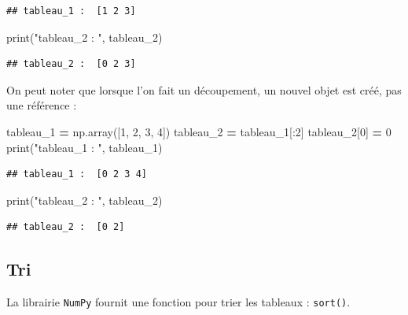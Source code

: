 \documentclass[
  12pt,
]{book}
\newenvironment{Shaded}{\begin{snugshade}}{\end{snugshade}}
\newcommand{\BuiltInTok}[1]{#1}
\newcommand{\DecValTok}[1]{\textcolor[rgb]{0.00,0.00,0.81}{#1}}
\newcommand{\NormalTok}[1]{#1}
\newcommand{\OperatorTok}[1]{\textcolor[rgb]{0.81,0.36,0.00}{\textbf{#1}}}
\newcommand{\StringTok}[1]{\textcolor[rgb]{0.31,0.60,0.02}{#1}}
\numberwithin{equation}{section}
\numberwithin{countremarque}{section}
\begin{document}
\begin{lstlisting}
## tableau_1 :  [1 2 3]
\end{lstlisting}

\begin{Shaded}
\begin{Highlighting}[]
\BuiltInTok{print}\NormalTok{(}\StringTok{"tableau\_2 : "}\NormalTok{, tableau\_2)}
\end{Highlighting}
\end{Shaded}

\begin{lstlisting}
## tableau_2 :  [0 2 3]
\end{lstlisting}

On peut noter que lorsque l'on fait un découpement, un nouvel objet est créé, pas une référence :

\begin{Shaded}
\begin{Highlighting}[]
\NormalTok{tableau\_1 }\OperatorTok{=}\NormalTok{ np.array([}\DecValTok{1}\NormalTok{, }\DecValTok{2}\NormalTok{, }\DecValTok{3}\NormalTok{, }\DecValTok{4}\NormalTok{])}
\NormalTok{tableau\_2 }\OperatorTok{=}\NormalTok{ tableau\_1[:}\DecValTok{2}\NormalTok{]}
\NormalTok{tableau\_2[}\DecValTok{0}\NormalTok{] }\OperatorTok{=} \DecValTok{0}
\BuiltInTok{print}\NormalTok{(}\StringTok{"tableau\_1 : "}\NormalTok{, tableau\_1)}
\end{Highlighting}
\end{Shaded}

\begin{lstlisting}
## tableau_1 :  [0 2 3 4]
\end{lstlisting}

\begin{Shaded}
\begin{Highlighting}[]
\BuiltInTok{print}\NormalTok{(}\StringTok{"tableau\_2 : "}\NormalTok{, tableau\_2)}
\end{Highlighting}
\end{Shaded}

\begin{lstlisting}
## tableau_2 :  [0 2]
\end{lstlisting}

\subsection{Tri}\label{tri-1}

La librairie \texttt{NumPy} fournit une fonction pour trier les tableaux : \texttt{sort()}.
\end{document}
